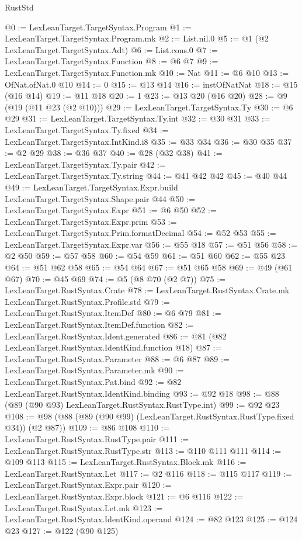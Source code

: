 \begin{lexlean}{RustStd}
\begin{coremodule}
{\begin{coremodule}
{{{{{@0 := LexLeanTarget.TargetSyntax.Program
@1 := LexLeanTarget.TargetSyntax.Program.mk
@2 := List.nil.{0}
@5 := @1 (@2 LexLeanTarget.TargetSyntax.Adt)
@6 := List.cons.{0}
@7 := LexLeanTarget.TargetSyntax.Function
@8 := @6 @7
@9 := LexLeanTarget.TargetSyntax.Function.mk
@10 := Nat
@11 := @6 @10
@13 := OfNat.ofNat.{0} @10
@14 := 0
@15 := @13 @14
@16 := instOfNatNat
@18 := @15 (@16 @14)
@19 := @11 @18
@20 := 1
@23 := @13 @20 (@16 @20)
@28 := @9 (@19 (@11 @23 (@2 @10)))
@29 := LexLeanTarget.TargetSyntax.Ty
@30 := @6 @29
@31 := LexLeanTarget.TargetSyntax.Ty.int
@32 := @30 @31
@33 := LexLeanTarget.TargetSyntax.Ty.fixed
@34 := LexLeanTarget.TargetSyntax.IntKind.i8
@35 := @33 @34
@36 := @30 @35
@37 := @2 @29
@38 := @36 @37
@40 := @28 (@32 @38)
@41 := LexLeanTarget.TargetSyntax.Ty.pair
@42 := LexLeanTarget.TargetSyntax.Ty.string
@44 := @41 @42 @42
@45 := @40 @44
@49 := LexLeanTarget.TargetSyntax.Expr.build LexLeanTarget.TargetSyntax.Shape.pair @44
@50 := LexLeanTarget.TargetSyntax.Expr
@51 := @6 @50
@52 := LexLeanTarget.TargetSyntax.Expr.prim
@53 := LexLeanTarget.TargetSyntax.Prim.formatDecimal
@54 := @52 @53
@55 := LexLeanTarget.TargetSyntax.Expr.var
@56 := @55 @18
@57 := @51 @56
@58 := @2 @50
@59 := @57 @58
@60 := @54 @59
@61 := @51 @60
@62 := @55 @23
@64 := @51 @62 @58
@65 := @54 @64
@67 := @51 @65 @58
@69 := @49 (@61 @67)
@70 := @45 @69
@74 := @5 (@8 @70 (@2 @7))
@75 := LexLeanTarget.RustSyntax.Crate
@78 := LexLeanTarget.RustSyntax.Crate.mk LexLeanTarget.RustSyntax.Profile.std
@79 := LexLeanTarget.RustSyntax.ItemDef
@80 := @6 @79
@81 := LexLeanTarget.RustSyntax.ItemDef.function
@82 := LexLeanTarget.RustSyntax.Ident.generated
@86 := @81 (@82 LexLeanTarget.RustSyntax.IdentKind.function @18)
@87 := LexLeanTarget.RustSyntax.Parameter
@88 := @6 @87
@89 := LexLeanTarget.RustSyntax.Parameter.mk
@90 := LexLeanTarget.RustSyntax.Pat.bind
@92 := @82 LexLeanTarget.RustSyntax.IdentKind.binding
@93 := @92 @18
@98 := @88 (@89 (@90 @93) LexLeanTarget.RustSyntax.RustType.int)
@99 := @92 @23
@108 := @98 (@88 (@89 (@90 @99) (LexLeanTarget.RustSyntax.RustType.fixed @34)) (@2 @87))
@109 := @86 @108
@110 := LexLeanTarget.RustSyntax.RustType.pair
@111 := LexLeanTarget.RustSyntax.RustType.str
@113 := @110 @111 @111
@114 := @109 @113
@115 := LexLeanTarget.RustSyntax.Block.mk
@116 := LexLeanTarget.RustSyntax.Let
@117 := @2 @116
@118 := @115 @117
@119 := LexLeanTarget.RustSyntax.Expr.pair
@120 := LexLeanTarget.RustSyntax.Expr.block
@121 := @6 @116
@122 := LexLeanTarget.RustSyntax.Let.mk
@123 := LexLeanTarget.RustSyntax.IdentKind.operand
@124 := @82 @123
@125 := @124 @23
@127 := @122 (@90 @125)
}}}}}
\end{coremodule}}
\end{coremodule}
\end{lexlean}
